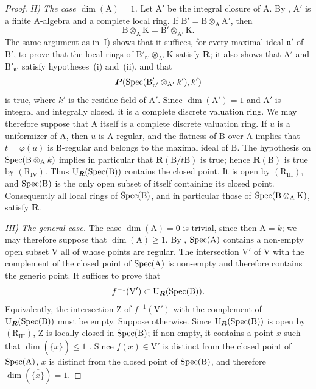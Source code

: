 \begin{proof}
\emph{II) The case $\dim(\mathrm{A})=1$.} Let $\mathrm{A}'$ be the integral closure of $\mathrm{A}$. By , $\mathrm{A}'$ is a finite $\mathrm{A}$-algebra and a complete local ring. If $\mathrm{B}'=\mathrm{B}\otimes_\mathrm{A}\mathrm{A}'$, then
\[
  \mathrm{B}\otimes_\mathrm{A}\mathrm{K}=\mathrm{B}'\otimes_{\mathrm{A}'}\mathrm{K}.
\]
The same argument as in~I) shows that it suffices, for every maximal ideal $\mathfrak{n}'$ of $\mathrm{B}'$, to prove that the local rings of $\mathrm{B}'_{\mathfrak{n}'}\otimes_{\mathrm{A}'}\mathrm{K}$ satisfy $\boldsymbol{R}$; it also shows that $\mathrm{A}'$ and $\mathrm{B}'_{\mathfrak{n}'}$ satisfy hypotheses~(i) and~(ii), and that
\[
  \boldsymbol{P}(\operatorname{Spec}(\mathrm{B}'_{\mathfrak{n}'}\otimes_{\mathrm{A}'}k'),k')
\]
is true, where $k'$ is the residue field of $\mathrm{A}'$. Since $\dim(\mathrm{A}')=1$  and $\mathrm{A}'$ is integral and integrally closed, it is a complete discrete valuation ring. We may therefore suppose that $\mathrm{A}$ itself is a complete discrete valuation ring. If $u$ is a uniformizer of $\mathrm{A}$, then $u$ is $\mathrm{A}$-regular, and the flatness of $\mathrm{B}$ over $\mathrm{A}$ implies that $t=\varphi(u)$ is $\mathrm{B}$-regular and belongs to the maximal ideal of $\mathrm{B}$. The hypothesis on $\operatorname{Spec}(\mathrm{B}\otimes_\mathrm{A}k)$ implies in particular that $\boldsymbol{R}(\mathrm{B}/t\mathrm{B})$ is true; hence $\boldsymbol{R}(\mathrm{B})$ is true by $(\mathrm{R}_{\mathrm{IV}})$. Thus $\mathrm{U}_{\boldsymbol{R}}(\operatorname{Spec}(\mathrm{B}))$ contains the closed point. It is open by $(\mathrm{R}_{\mathrm{III}})$, and $\operatorname{Spec}(\mathrm{B})$ is the only open subset of itself containing its closed point. Consequently all local rings of $\operatorname{Spec}(\mathrm{B})$, and in particular those of $\operatorname{Spec}(\mathrm{B}\otimes_\mathrm{A}\mathrm{K})$, satisfy $\boldsymbol{R}$.

\emph{III) The general case.} The case $\dim(\mathrm{A})=0$ is trivial, since then $\mathrm{A}=k$; we may therefore suppose that $\dim(\mathrm{A})\geqslant1$. By , $\operatorname{Spec}(\mathrm{A})$ contains a non-empty open subset $\mathrm{V}$ all of whose points are regular. The intersection $\mathrm{V}'$ of $\mathrm{V}$ with the complement of the closed point of $\operatorname{Spec}(\mathrm{A})$ is non-empty and therefore contains the generic point. It suffices to prove that
\[
  f^{-1}(\mathrm{V}')\subset\mathrm{U}_{\boldsymbol{R}}(\operatorname{Spec}(\mathrm{B})).
\]
Equivalently, the intersection $\mathrm{Z}$ of $f^{-1}(\mathrm{V}')$ with the complement of $\mathrm{U}_{\boldsymbol{R}}(\operatorname{Spec}(\mathrm{B}))$ must be empty. Suppose otherwise. Since $\mathrm{U}_{\boldsymbol{R}}(\operatorname{Spec}(\mathrm{B}))$ is open by $(\mathrm{R}_{\mathrm{III}})$, $\mathrm{Z}$ is locally closed in $\operatorname{Spec}(\mathrm{B})$; if non-empty, it contains a point $x$ such that $\dim(\overline{\{x\}})\leqslant1$ . Since $f(x)\in\mathrm{V}'$ is distinct from the closed point of $\operatorname{Spec}(\mathrm{A})$, $x$ is distinct from the closed point of $\operatorname{Spec}(\mathrm{B})$, and therefore $\dim(\overline{\{x\}})=1$.


\end{proof}
